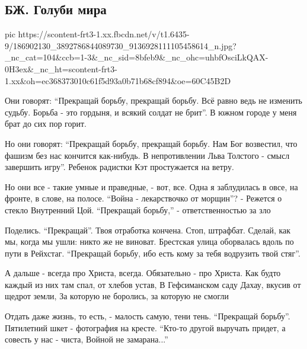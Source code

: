  
 
 
 
 

\subsection{БЖ. Голуби мира}
\label{sec:15_05_2021.fb.bilchenko_evgenia.2.golubi_mira}

\ifcmt
  pic https://scontent-frt3-1.xx.fbcdn.net/v/t1.6435-9/186902130_3892786844089730_9136928111105458614_n.jpg?_nc_cat=104&ccb=1-3&_nc_sid=8bfeb9&_nc_ohc=uhbfOsciLkQAX-0H3ex&_nc_ht=scontent-frt3-1.xx&oh=ec368373010c61f5d93a0b71b68cf894&oe=60C45B2D
\fi

Они говорят: \enquote{Прекращай борьбу, прекращай борьбу.
Всё равно ведь не изменить судьбу.
Борьба - это гордыня, и всякий солдат не брит}.
В южном городе у меня брат до сих пор горит.

Но они говорят: \enquote{Прекращай борьбу, прекращай борьбу.
Нам Бог возвестил, что фашизм без нас кончится как-нибудь.
В непротивлении Льва Толстого - смысл завершить игру}.
Ребенок радистки Кэт простужается на ветру.

Но они все - такие умные и праведные, - вот, все.
Одна я заблудилась в овсе, на фронте, в слове, на полосе.
\enquote{Война - лекарствочко от морщин}? - Режется о стекло
Внутренний Цой. \enquote{Прекращай борьбу,} -  ответственностью за зло

Поделись. \enquote{Прекращай}. Твоя отработка кончена. Стоп, штрафбат.
Сделай, как мы, когда мы ушли: никто же не виноват.
Брестская улица оборвалась вдоль по пути в Рейхстаг.
\enquote{Прекращай борьбу, ибо есть кому за тебя водрузить твой стяг}.

А дальше - всегда про Христа, всегда. Обязательно - про Христа.
Как будто каждый из них там спал, от хлебов устав,
В Гефсиманском саду Дахау, вкусив от щедрот земли,
За которую не боролись, за которую не смогли

Отдать даже жизнь, то есть, - малость самую, тени тень.
\enquote{Прекращай борьбу}. Пятилетний шкет - фотография на кресте.
\enquote{Кто-то другой выручать придет, а совесть у нас - чиста,
Войной не замарана...}

